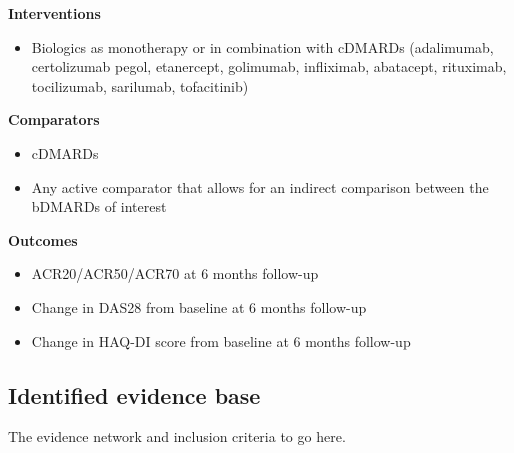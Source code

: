 \documentclass[11pt,final,fleqn]{article}\usepackage[]{graphicx}\usepackage[]{color}
\theoremstyle{plain}
\begin{document}
\begin{appendices}
\textbf{Interventions}

\begin{itemize}
\item Biologics as monotherapy or in combination with cDMARDs (adalimumab, certolizumab pegol, etanercept, golimumab, infliximab, abatacept, rituximab, tocilizumab, sarilumab, tofacitinib)
\end{itemize}

\textbf{Comparators}

\begin{itemize}
\item cDMARDs
\item Any active comparator that allows for an indirect comparison between the bDMARDs of interest
\end{itemize}

\textbf{Outcomes}

\begin{itemize}
\item ACR20/ACR50/ACR70 at 6 months follow-up
\item Change in DAS28 from baseline at 6 months follow-up
\item Change in HAQ-DI score from baseline at 6 months follow-up 
\end{itemize}

\subsection{Identified evidence base}\label{identified-evidence-base}
The evidence network and inclusion criteria to go here.





\end{appendices}
\end{document}
